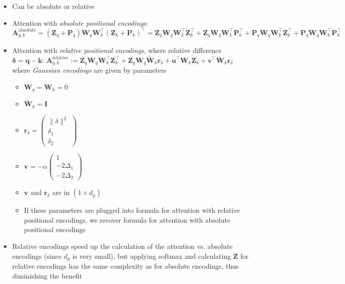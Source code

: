 \begin{itemize}
    \item Can be absolute or relative
    \item Attention with \emph{absolute positional encodings}: $
    \boldsymbol{A}_{q,k}^{\text{absolute}} = \left( \boldsymbol{Z}_{q} + \boldsymbol{P}_{q} \right) \boldsymbol{W}_q \boldsymbol{W}_k^\intercal \left( \boldsymbol{Z}_{k} + \boldsymbol{P}_{k} \right)^\intercal
    = \boldsymbol{Z}_{q} \boldsymbol{W}_q \boldsymbol{W}_k^\intercal \boldsymbol{Z}_{k}^\intercal 
    + \boldsymbol{Z}_{q} \boldsymbol{W}_q \boldsymbol{W}_k^\intercal \boldsymbol{P}_{k}^\intercal 
    + \boldsymbol{P}_{q} \boldsymbol{W}_q \boldsymbol{W}_k^\intercal \boldsymbol{Z}_{k}^\intercal 
    + \boldsymbol{P}_{q} \boldsymbol{W}_q \boldsymbol{W}_k^\intercal \boldsymbol{P}_{k}^\intercal
    $
    \item Attention with \emph{relative positional encodings}, where relative difference $\boldsymbol{\delta} = \boldsymbol{q}-\boldsymbol{k}$: 
    $
    \boldsymbol{A}_{q,k}^{\text{relative}} := \boldsymbol{Z}_{q} \boldsymbol{W}_q \boldsymbol{W}_k^\intercal \boldsymbol{Z}_{k}^\intercal 
    + \boldsymbol{Z}_{q} \boldsymbol{W}_q \widetilde{\boldsymbol{W}}_k \boldsymbol{r}_\delta 
    + \boldsymbol{u}^\intercal \boldsymbol{W}_k \boldsymbol{Z}_{k} 
    + \boldsymbol{v}^\intercal \widetilde{\boldsymbol{W}}_k \boldsymbol{r}_\delta
    $ where \emph{Gaussian encodings} are given by parameters
    \begin{itemize}
        \item $
        \boldsymbol{W}_q = \boldsymbol{W}_k = 0
        $
        \item $
        \widetilde{\boldsymbol{W}}_k = \boldsymbol{I}
        $
        \item $
        \boldsymbol{r}_\delta = 
        \begin{pmatrix}
        \|\delta\|^2 \\
        \delta_1 \\
        \delta_2
        \end{pmatrix}
        $
        \item $
        \boldsymbol{v} = -\alpha 
        \begin{pmatrix}
        1 \\
        -2\Delta_1 \\
        -2\Delta_2
        \end{pmatrix}
        $
        \item $\boldsymbol{v}$ and $\boldsymbol{r}_\delta$ are in $(1 \times d_p)$
        \item If these parameters are plugged into formula for attention with relative positional encodings, we recover formula for attention with absolute positional encodings
    \end{itemize}
    \item Relative encodings speed up the calculation of the attention vs. absolute encodings (since $d_p$ is very small), but applying softmax and calculating $\boldsymbol{Z}$ for relative encodings has the same complexity as for absolute encodings, thus diminishing the benefit
\end{itemize}

